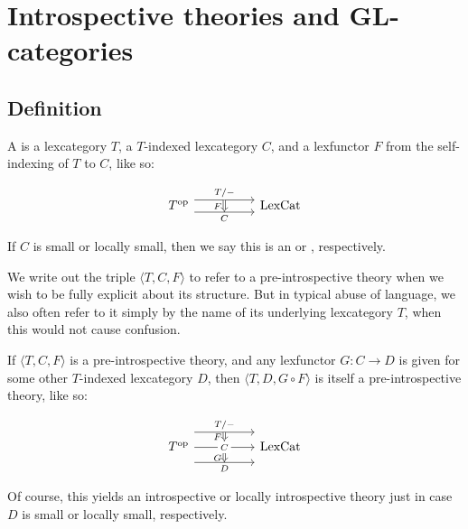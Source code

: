 \section{Introspective theories and GL-categories}

\subsection{Definition}
\begin{definition} \label{IntrospectiveTheory}
A  is a lexcategory $T$, a $T$-indexed lexcategory $C$, and a lexfunctor $F$ from the self-indexing of $T$ to $C$, like so:

\[\begin{tikzcd}
	{\op{T}} && {\LexCat}
	\arrow["{T/-}"{name=0}, from=1-1, to=1-3, shift left=2]
	\arrow["{C}"{name=1, swap}, from=1-1, to=1-3, shift right=2]
	\arrow[Rightarrow, "{F}"', from=0, to=1]
\end{tikzcd}\]

If $C$ is small or locally small, then we say this is an  or , respectively.
\end{definition}

We write out the triple $\langle T, C, F \rangle$ to refer to a pre-introspective theory when we wish to be fully explicit about its structure. But in typical abuse of language, we also often refer to it simply by the name of its underlying lexcategory $T$, when this would not cause confusion.

\begin{construction}
If $\langle T, C, F \rangle$ is a pre-introspective theory, and any lexfunctor $G : C \to D$ is given for some other $T$-indexed lexcategory $D$, then $\langle T, D, G \circ F \rangle$ is itself a pre-introspective theory, like so: 

\[\begin{tikzcd}
	{\op{T}} && {\LexCat}
	\arrow["{T/-}"{name=0}, from=1-1, to=1-3, shift left=5]
	\arrow["{C}"{name=1, description}, from=1-1, to=1-3]
	\arrow["{D}"{name=2, swap}, from=1-1, to=1-3, shift right=5]
	\arrow[Rightarrow, "{F}"', from=0, to=1]
	\arrow[Rightarrow, "{G}"', from=1, to=2]
\end{tikzcd}\]

Of course, this yields an introspective or locally introspective theory just in case $D$ is small or locally small, respectively.
\end{construction}

